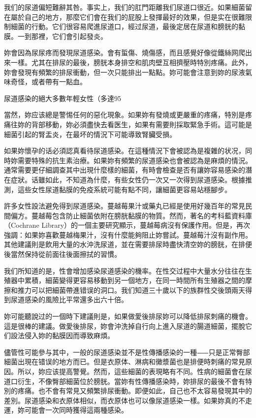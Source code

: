 \documentclass[12pt,UTF8]{ctexbook}
\begin{document}
我们的尿道偏短難辭其咎。事实上，我们的肛門距離我们尿道口很近。如果細菌留在屬於自己的地方，那麼它们會在我们的屁股上發揮最好的效果，但是实在很難限制細菌的行動。它们很容易爬進尿道口，經过尿道，最後定居在尿道和膀胱的黏膜。一到那裡，它们會引起發炎。

妳會因為尿尿疼而發現尿道感染。會有蜇傷、燒傷感，而且感覺好像從鐵絲网爬出來一樣。尤其在排尿的最後，膀胱本身排空和肌肉壁互相擠壓時特別疼痛。此外，妳會發現有頻繁的排尿衝動，但一次只能排出一點點。妳可能會注意到妳的尿液氣味奇怪，或者帶有一點血。

尿道感染的絕大多數年輕女性（多達95%

當然，妳应该總是警惕任何的惡化現象。如果妳有發燒或更嚴重的疼痛，特別是疼痛往妳的背部移動，妳必須盡快去看医生，如果有需要則採取緊急手術。這可能是細菌引起的腎盂炎，在最坏的情況下可能導致腎臟受損。

如果妳懷孕的话必須認真看待尿道感染。在這種情況下會被認為是複雜的状况，同時妳需要特殊的抗生素治療。如果妳有頻繁的尿道感染也會被認為是麻煩的情況。通常需要更仔細調查其中出現什麼樣的細菌，有時會檢查是否有讓妳容易感染的潛在症狀。话雖如此，不知道為什麼，有些女性仍一次又一次得到尿道感染。根據推測，這些女性尿道黏膜的免疫系統可能有點不同，讓細菌更容易站穩腳步。

許多女性設法避免得到尿道感染。蔓越莓果汁或藥丸已經是使用好幾百年的常見民間偏方。蔓越莓包含防止細菌依附在膀胱黏膜的物質。然而，著名的考科藍資料庫（Cochrane Library）的一個主要研究顯示，蔓越莓病沒有保護作用。但是，再次強調：如果妳喜歡蔓越梅果汁，沒有什麼能夠阻止妳嘗試。蔓越莓汁沒有副作用。其他建議則是飲用大量的水沖洗尿道，並在需要排尿時盡快清空妳的膀胱，在排便後當然保持從前面往後面擦拭的習慣。

我们所知道的是，性會增加感染尿道感染的機率。在性交过程中大量水分往往在生殖器中累積，細菌變得更容易移動到另一個地方，在同一時間所有生殖器之間的摩擦和推力可以把細菌帶進错误的洞口。我们知道三十歲以下的族群性交後頭兩天得到尿道感染的風險比平常還多出六十倍。

妳可能聽說过的一個時下建議則是，如果做愛後排尿妳可以降低排尿刺痛的機會。這是很棒的建議。做愛後排尿，妳會沖洗掉自行向上進入尿道的腸道細菌，擺脫它们設法侵入妳的黏膜因而導致麻煩。

儘管性可能參与其中，一般的尿道感染並不是性傳播感染的一種⸺只是正常臀部細菌出現在错误的地方而已。但是衣原体、淋病和黴漿菌也是排便時刺痛的常見原因。所以，妳应该提高警覺。然而，這些細菌的表現略有不同。性病的細菌會在尿道口衍生，不像臀部細菌位於膀胱。當妳有性傳播感染時，妳排尿的最後不會有特別的疼痛。也不會有常見又頻繁排尿衝動。即便如此，自己也不太容易發現其中的差別。尿道感染和衣原体相似，而衣原体也可以像尿道感染一樣。如果妳真的不走運，妳可能會一次同時獲得這兩種感染。
\end{document}
